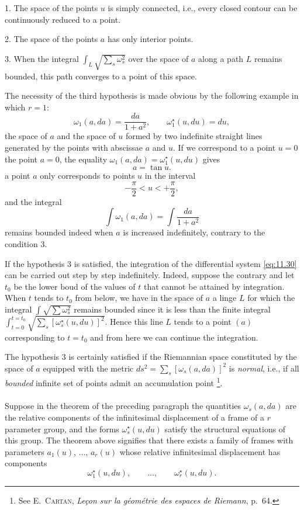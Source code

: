 \documentclass[leqno,11pt]{book}
\numberwithin{equation}{chapter}
\theoremstyle{shape1}
\theoremstyle{shapesmall}
\newcommand{\str}{^{\star}}
\newcommand{\somespace}{\vspace{9pt}}
\begin{document}
\somespace

1. The space of the points $u$ is simply connected, i.e., every closed contour can be continuously reduced to a point.

2. The space of the points $a$ has only interior points.

3. When the integral $\displaystyle{\int_{L}\sqrt{\sum_{s}\omega_{s}^{2}}}$ over the space of $a$ along a path $L$ remains bounded, this path converges to a point of this space.

\somespace

The necessity of the third hypothesis is made obvious by the following example in which $r=1$:
\[
\omega_{1}(a,da)=\frac{da}{1+a^{2}},\qquad\omega_{1}\str(u,du)=du,
\]
the space of $a$ and the space of $u$ formed by two indefinite straight lines generated by the points with abscissae $a$ and $u$. If we correspond to a point $u=0$ the point $a=0$, the equality $\omega_{1}(a,da)=\omega_{1}\str(u,du)$ gives
\[
a=\tan u.
\]
a point $a$ only corresponds to points $u$ in the interval
\[
-\frac{\pi}{2}<u<+\frac{\pi}{2},
\]
and the integral
\[
\int \omega_{1}(a,da)=\int\frac{da}{1+a^{2}}
\]
remains bounded indeed when $a$ is increased indefinitely, contrary to the condition 3.

If the hypothesis 3 is satisfied, the integration of the differential system \eqref{eq:11.30} can be carried out step by step indefinitely. Indeed, suppose the contrary and let $t_{0}$ be the lower boud of the values of $t$ that cannot be attained by integration. When $t$ tends to $t_{0}$ from below, we have in the space of $a$ a linge $L$ for which the integral $\displaystyle{\int\sqrt{\sum\omega_{s}^{2}}}$ remains bounded since it is less than the finite integral $\displaystyle{\int_{t=0}^{t=t_{0}}\sqrt{\sum_{s}[\omega_{s}\str(u,du)]^{2}}}$. Hence this line $L$ tends to a point $(a)$ corresponding to $t=t_{0}$ and from here we can continue the integration.

The hypothesis 3 is certainly satisfied if the Riemannian space constituted by the space of $a$ equipped with the metric $ds^{2}=\sum_{s}[\omega_{s}(a,da)]^{2}$ is \emph{normal}, i.e., if all \emph{bounded} infinite set of points admit an accumulation point \footnote{See \textsc{E.~Cartan}, \emph{Leçon sur la géométrie des espaces de Riemann}, p.~64.}.


\paragraph{}
\label{sec:163}
Suppose in the theorem of the preceding paragraph the quantities $\omega_{s}(a,da)$ are the relative components of the infinitesimal displacement of a frame of a $r$ parameter group, and the forms $\omega_{s}\str(u,du)$ satisfy the structural equations of this group. The theorem above signifies that there exists a family of frames with parameters $a_{1}(u)$, $\dots$, $a_{r}(u)$ whose relative infinitesimal displacement has components
\[
\omega\str_{1}(u,du),\qquad\dots,\qquad\omega_{r}\str(u,du).
\]
\end{document}
